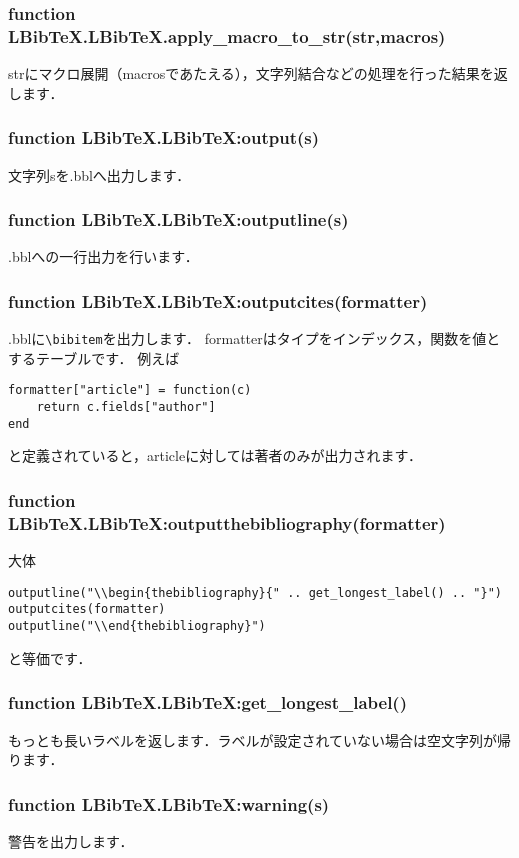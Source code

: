 \documentclass[dvipdfmx,a4paper]{jsarticle}
\begin{document}
\subsubsection{function LBibTeX.LBibTeX.apply\_macro\_to\_str(str,macros)}
strにマクロ展開（macrosであたえる），文字列結合などの処理を行った結果を返します．

\subsubsection{function LBibTeX.LBibTeX:output(s)}
文字列sを.bblへ出力します．

\subsubsection{function LBibTeX.LBibTeX:outputline(s)}
.bblへの一行出力を行います．

\subsubsection{function LBibTeX.LBibTeX:outputcites(formatter)}
.bblに\verb|\bibitem|を出力します．
formatterはタイプをインデックス，関数を値とするテーブルです．
例えば
\begin{lstlisting}
formatter["article"] = function(c)
	return c.fields["author"]
end
\end{lstlisting}
と定義されていると，articleに対しては著者のみが出力されます．

\subsubsection{function LBibTeX.LBibTeX:outputthebibliography(formatter)}
大体
\begin{lstlisting}
outputline("\\begin{thebibliography}{" .. get_longest_label() .. "}")
outputcites(formatter)
outputline("\\end{thebibliography}")
\end{lstlisting}
と等価です．

\subsubsection{function LBibTeX.LBibTeX:get\_longest\_label()}
もっとも長いラベルを返します．ラベルが設定されていない場合は空文字列が帰ります．

\subsubsection{function LBibTeX.LBibTeX:warning(s)}
警告を出力します．
\end{document}
